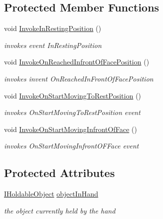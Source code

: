 \subsection*{Protected Member Functions}
\begin{DoxyCompactItemize}
\item 
void \mbox{\hyperlink{class_player_hand_a886f7afd66af7f0dc59696953aaed4b4}{Invoke\+In\+Resting\+Position}} ()
\begin{DoxyCompactList}\small\item\em invokes event In\+Resting\+Position \end{DoxyCompactList}\item 
void \mbox{\hyperlink{class_player_hand_aa2accfa8b13a70b78b1cd4029cdaaa1e}{Invoke\+On\+Reached\+Infront\+Of\+Face\+Position}} ()
\begin{DoxyCompactList}\small\item\em invokes invent On\+Reached\+In\+Front\+Of\+Face\+Position \end{DoxyCompactList}\item 
void \mbox{\hyperlink{class_player_hand_a2c861364aaf53271c0e3dc1e42ee5e47}{Invoke\+On\+Start\+Moving\+To\+Rest\+Position}} ()
\begin{DoxyCompactList}\small\item\em invokes On\+Start\+Moving\+To\+Rest\+Position event \end{DoxyCompactList}\item 
void \mbox{\hyperlink{class_player_hand_a1f8cc0ae3bc7e9d3c4d21943eb09852e}{Invoke\+On\+Start\+Moving\+Infront\+Of\+Face}} ()
\begin{DoxyCompactList}\small\item\em invokes On\+Start\+Moving\+Infront\+O\+F\+Face event \end{DoxyCompactList}\end{DoxyCompactItemize}
\subsection*{Protected Attributes}
\begin{DoxyCompactItemize}
\item 
\mbox{\hyperlink{interface_i_holdable_object}{I\+Holdable\+Object}} \mbox{\hyperlink{class_player_hand_a043a1be665181f9e3c9d00cd18e4c4fe}{object\+In\+Hand}}
\begin{DoxyCompactList}\small\item\em the object currently held by the hand \end{DoxyCompactList}\end{DoxyCompactItemize}
